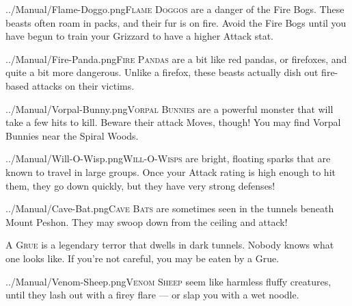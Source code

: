 \documentclass[10pt,twocolumn,openany,article]{memoir}
\begin{document}
\vspace{14pt}

\lettrine[image=true,                lines=5,               findent=3pt,
nindent=3pt]{../Manual/Flame-Doggo.png}{Flame  Doggos} are  a danger  of
the Fire  Bogs. These beasts  often roam in packs,  and their fur  is on
fire. Avoid the Fire Bogs until you have begun to train your Grizzard to
have a higher Attack stat.

\vspace{14pt}

\lettrine[image=true,                lines=5,               findent=3pt,
nindent=3pt]{../Manual/Fire-Panda.png}{Fire Pandas}  are a bit  like red
pandas, or firefoxes, and quite a  bit more dangerous. Unlike a firefox,
these beasts actually dish out fire-based attacks on their victims.

\vspace{14pt}

\lettrine[image=true,                lines=5,               findent=3pt,
nindent=3pt]{../Manual/Vorpal-Bunny.png}{Vorpal Bunnies}  are a powerful
monster that  will take a few  hits to kill. Beware  their attack Moves,
though! You may find Vorpal Bunnies near the Spiral Woods.

\pagebreak

\lettrine[image=true,                lines=5,               findent=3pt,
nindent=3pt]{../Manual/Will-O-Wisp.png}{Will-O-Wisps}     are    bright,
floating sparks  that are  known to  travel in  large groups.  Once your
Attack rating is high enough to hit them, they go down quickly, but they
have very strong defenses!

\vspace{14pt}

\lettrine[image=true,                lines=5,               findent=3pt,
nindent=3pt]{../Manual/Cave-Bat.png}{Cave  Bats} are  sometimes seen  in
the tunnels beneath  Mount Peshon. They may swoop down  from the ceiling
and attack!

\vspace{14pt}

\textsc{A  Grue} is  a legendary  terror  that dwells  in dark  tunnels.
Nobody knows  what one  looks like.  If you're not  careful, you  may be
eaten by a Grue.

\vspace{14pt}

\lettrine[image=true,                lines=5,               findent=3pt,
nindent=3pt]{../Manual/Venom-Sheep.png}{Venom Sheep}  seem like harmless
fluffy creatures, until they lash out with a firey flare --- or slap you
with a wet noodle.
\end{document}
